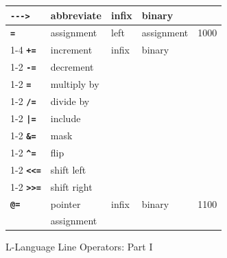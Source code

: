 \documentclass[12pt]{article}
\newcommand{\ABV}{-{}-{}->}
\newcommand{\ttkey}[1]{{\tt \bfseries #1}}
\newlength{\figurewidth}
\newenvironment{boxedfigure}[1][!btp]%
	{\begin{figure}[#1]
	 \begin{lrbox}{\figurebox}
	 \begin{minipage}{\figurewidth}

	 \vspace*{1ex}}%
	{
	 \vspace*{1ex}

	 \end{minipage}
	 \end{lrbox}

	 \centering
	 \fbox{\hspace*{0.1in}\usebox{\figurebox}\hspace*{0.1in}}
	 \end{figure}}
\begin{document}
\begin{boxedfigure}[!p]
\begin{center}
\begin{tabular}{|l|l|l|l|r|}
\ttkey{\ABV} & abbreviate & infix & binary &
\\\hline
\ttkey{=} & assignment & left & assignment & 1000
\\\cline{1-4}
\ttkey{+=} & increment & infix & binary &
\\\cline{1-2}
\ttkey{-=} & decrement & & &
\\\cline{1-2}
\ttkey{*=} & multiply by & & &
\\\cline{1-2}
\ttkey{/=} & divide by & & &
\\\cline{1-2}
\ttkey{|=} & include & & &
\\\cline{1-2}
\ttkey{\&=} & mask & & &
\\\cline{1-2}
\ttkey{\textasciicircum=} & flip & & &
\\\cline{1-2}
\ttkey{<{}<=} & shift left & & &
\\\cline{1-2}
\ttkey{>{}>=} & shift right & & &
\\\hline
\ttkey{@=} & pointer & infix & binary & 1100 \\
           & assignment & & &
\\\hline
\end{tabular}
\end{center}

\caption{L-Language Line Operators: Part I}
\label{L-LANGUAGE-LINE-OPERATORS-1}
\end{boxedfigure}
\end{document}
